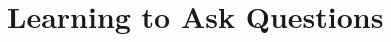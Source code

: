 \documentclass[../../main]{subfiles}
\begin{document}
\section{Learning to Ask Questions} \label{sec:}
\end{document}
